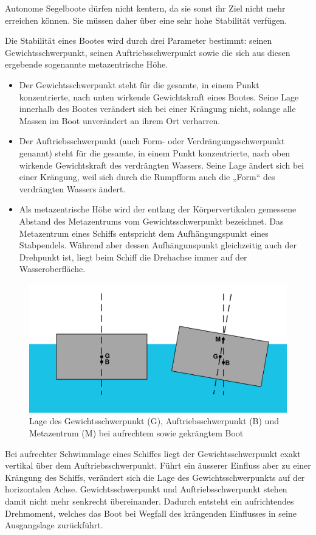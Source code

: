 Autonome Segelboote dürfen nicht kentern, da sie sonst ihr Ziel nicht mehr erreichen können. Sie müssen daher über eine sehr hohe Stabilität verfügen.

Die Stabilität eines Bootes wird durch drei Parameter bestimmt: seinen Gewichtsschwerpunkt, seinen Auftriebsschwerpunkt sowie die sich aus diesen ergebende sogenannte metazentrische Höhe.\cite{noauthor_stabilitat_2023-1}  
\begin{itemize}
    \item Der Gewichtsschwerpunkt steht für die gesamte, in einem Punkt konzentrierte, nach unten wirkende Gewichtskraft eines Bootes. Seine Lage innerhalb des Bootes verändert sich bei einer Krängung nicht, solange alle Massen im Boot unverändert an ihrem Ort verharren.
    \item Der Auftriebsschwerpunkt (auch Form- oder Verdrängungsschwerpunkt genannt) steht für die gesamte, in einem Punkt konzentrierte, nach oben wirkende Gewichtskraft des verdrängten Wassers. Seine Lage ändert sich bei einer Krängung, weil sich durch die Rumpfform auch die „Form“ des verdrängten Wassers ändert.
    \item Als metazentrische Höhe wird der entlang der Körpervertikalen gemessene Abstand des Metazentrums vom Gewichtsschwerpunkt bezeichnet. Das Metazentrum eines Schiffs entspricht dem Aufhängungspunkt eines Stabpendels. Während aber dessen Aufhängunspunkt gleichzeitig auch der Drehpunkt ist, liegt beim Schiff die Drehachse immer auf der Wasseroberfläche.\cite{noauthor_metazentrische_nodate}
\end{itemize}
\begin{figure}[H]
    \centering
    \includegraphics[width=0.75\linewidth]{Metacentriskhojd-svg.svg.png}
    \caption{Lage des Gewichtsschwerpunkt (G), Auftriebsschwerpunkt (B) und Metazentrum (M) bei aufrechtem sowie gekrängtem Boot }
    \label{fig:enter-label}
\end{figure}
Bei aufrechter Schwimmlage eines Schiffes liegt der Gewichtsschwerpunkt exakt vertikal über dem Auftriebsschwerpunkt. Führt ein äusserer Einfluss aber zu einer Krängung des Schiffs, verändert sich die Lage des Gewichtsschwerpunkts auf der horizontalen Achse. Gewichtsschwerpunkt und Auftriebsschwerpunkt stehen damit nicht mehr senkrecht übereinander. Dadurch entsteht ein aufrichtendes Drehmoment, welches das Boot bei Wegfall des krängenden Einflusses in seine Ausgangslage zurückführt.

